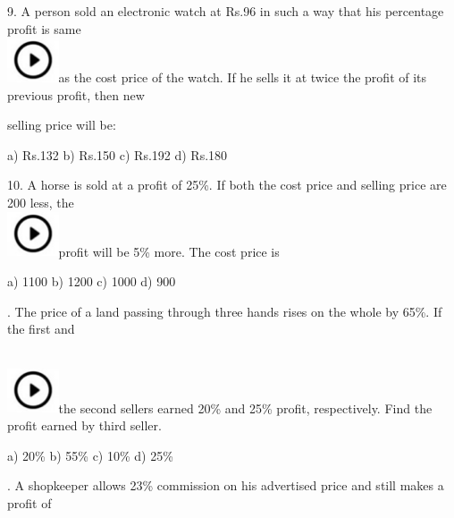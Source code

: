 \documentclass{article}
\begin{document}
	9.   A person sold an electronic watch at Rs.96 in such a way that his percentage profit is same \noindent \\ \includegraphics*[width=0.60in, height=0.52in]{images/image1}as the cost price of the watch. If he sells it at twice the profit of its previous profit, then new
	
	\noindent selling price will be:
	
	\noindent 
	
	\noindent a) Rs.132                 b) Rs.150          c) Rs.192           d) Rs.180
	
	\noindent 
	
	10. A horse is sold at a profit of 25\%. If both the cost price and selling price are 200 less, the \noindent \\ \includegraphics*[width=0.60in, height=0.52in]{images/image1}profit will be 5\% more. The cost price is
	
	\noindent a) 1100                    b) 1200             c) 1000              d) 900
	
	\noindent 
	
	. The price of a land passing through three hands rises on the whole by  65\%. If the first and
	
	\noindent 
	
	\noindent \noindent \\ \includegraphics*[width=0.60in, height=0.52in]{images/image1}the second sellers earned 20\% and 25\% profit, respectively. Find the profit earned by  third seller.
	
	\noindent 
	
	\noindent a) 20\%                    b) 55\%              c) 10\%              d) 25\%
	
	\noindent 
	
	\noindent 
	
	. A shopkeeper allows 23\% commission on his advertised price and still makes a profit of
	
\end{document}
